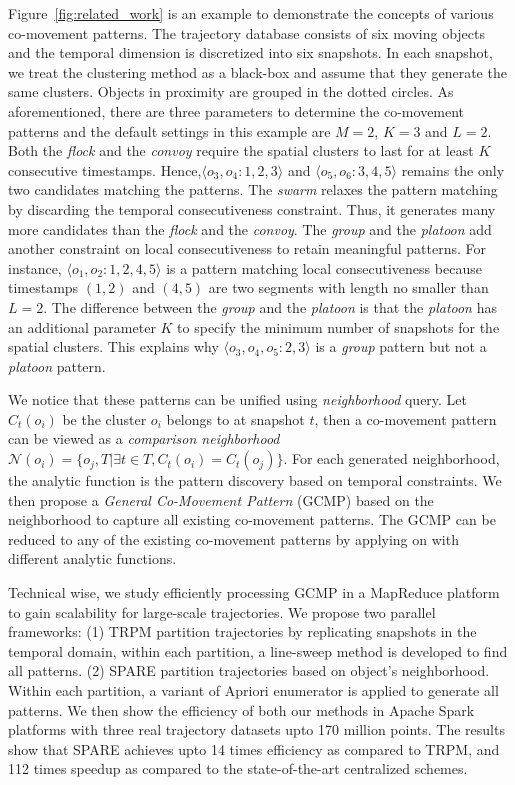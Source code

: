 Figure~\ref{fig:related_work} is an example to demonstrate the concepts of various co-movement patterns. The trajectory database consists of six moving objects and the temporal dimension is discretized into six snapshots. In each snapshot, we treat the clustering method as a black-box and assume that they generate the same clusters. Objects in proximity are grouped in the dotted circles. As aforementioned, there are three parameters to determine the co-movement patterns and the default settings in this example are $M=2$, $K=3$ and $L=2$. Both the \emph{flock} and the \emph{convoy} require the spatial clusters to last for at least $K$ consecutive  timestamps. Hence,$\langle o_3,o_4:1,2,3 \rangle$ and $\langle o_5,o_6:3,4,5 \rangle$  remains the only two candidates matching the patterns. The \textit{swarm} relaxes the pattern matching by discarding the temporal consecutiveness constraint. Thus, it generates many more candidates than the \textit{flock} and the \textit{convoy}. The \textit{group} and the \textit{platoon} add another constraint on local consecutiveness to retain meaningful patterns. For instance, $\langle o_1,o_2:1,2,4,5 \rangle$ is a pattern matching local consecutiveness because timestamps $(1,2)$ and $(4,5)$ are two segments with length no smaller than $L=2$. The difference between the \textit{group} and the \textit{platoon} is that the \textit{platoon} has an additional parameter $K$ to specify the minimum number of snapshots for the spatial clusters. This explains why $\langle o_3,o_4,o_5:2,3 \rangle$ is a \textit{group} pattern but not a \textit{platoon} pattern.



We notice that these patterns can be unified using \emph{neighborhood} query. Let $C_t(o_i)$ be the cluster $o_i$ belongs to at snapshot $t$, then a co-movement pattern 
can be viewed as a \emph{comparison neighborhood} $\mathcal{N}(o_i)=\{o_j, T | \exists t \in T, C_t(o_i) = C_t(o_j)\}$. For each generated neighborhood, the analytic function is the pattern discovery
based on temporal constraints. We then propose a \emph{General Co-Movement Pattern} (GCMP) based on the neighborhood to capture all existing co-movement patterns. The GCMP can be reduced to any of the existing co-movement patterns by applying on with different analytic functions.

Technical wise, we study efficiently processing GCMP in a MapReduce platform to gain scalability for large-scale trajectories. We propose two parallel frameworks: (1) TRPM partition trajectories by replicating snapshots in the temporal domain, within each partition, a line-sweep method is developed to find all patterns. (2) SPARE partition trajectories based on object's neighborhood. Within each partition, a variant of Apriori enumerator is applied to generate all patterns. We then show the efficiency of both our methods in Apache Spark platforms with three real trajectory datasets upto 170 million points. The results show that SPARE achieves upto 14 times efficiency as compared to TRPM, and 112 times speedup as compared to the state-of-the-art centralized schemes.

